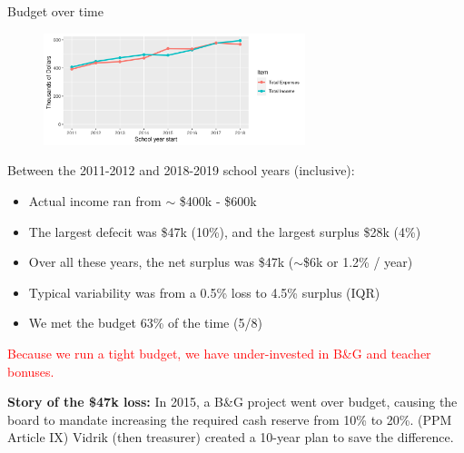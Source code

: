\documentclass[8pt]{beamer}
\begin{document}

\begin{frame}{Budget over time}
\begin{figure}
\begin{center}
\includegraphics[width=3in]{budget_history.png}
\end{center}
\end{figure}

Between the 2011-2012 and 2018-2019 school years (inclusive):
%
\begin{itemize}
%
\item Actual income ran from $\sim$ \$400k - \$600k
\item The largest defecit was \$47k (10\%), and the largest surplus \$28k (4\%)
\item Over all these years, the net surplus was \$47k ($\sim$\$6k or 1.2\% / year)
\item Typical variability was from a 0.5\% loss to 4.5\% surplus (IQR)
\item We met the budget 63\% of the time (5/8)
%
\end{itemize}
%
\textcolor{red}{Because we run a tight budget, we have
under-invested in B\&G and teacher bonuses.}

\textbf{Story of the \$47k loss:}
In 2015, a B\&G project went over budget, causing the board to mandate
increasing the required cash reserve from 10\% to 20\%.
(PPM Article IX)
Vidrik (then treasurer) created a 10-year plan to save the difference.

\end{frame}


\end{document}
